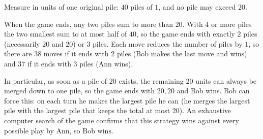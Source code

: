 Measure in units of one original pile: $40$ piles of $1$, and no pile may exceed $20$.

When the game ends, any two piles sum to more than $20$. With $4$ or more piles the two smallest sum to at most half of $40$, so the game ends with exactly $2$ piles (necessarily $20$ and $20$) or $3$ piles. Each move reduces the number of piles by $1$, so there are $38$ moves if it ends with $2$ piles (Bob makes the last move and wins) and $37$ if it ends with $3$ piles (Ann wins).

In particular, as soon as a pile of $20$ exists, the remaining $20$ units can always be merged down to one pile, so the game ends with $20,20$ and Bob wins. Bob can force this: on each turn he makes the largest pile he can (he merges the largest pile with the largest pile that keeps the total at most $20$). An exhaustive computer search of the game confirms that this strategy wins against every possible play by Ann, so $\boxed{\text{Bob wins}}$.
